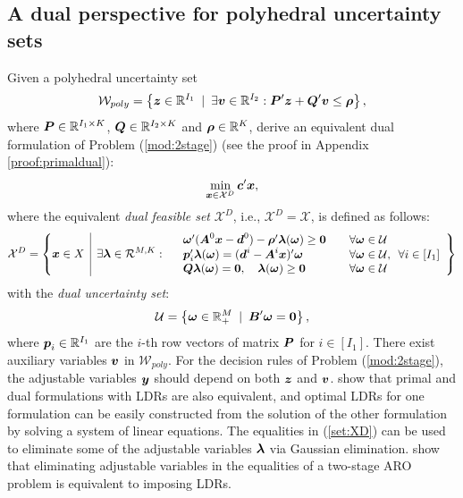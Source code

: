\documentclass[fleqn,mnsc,blindrev]{informs4}
\newcommand{\mb}[1]{\mbox{\boldmath \ensuremath{#1}}}
\begin{document}
	\subsection{A dual perspective for polyhedral uncertainty sets}
	\noindent Given a polyhedral uncertainty set
\begin{equation*}
	\mathcal{W}_{poly} = \left\{\mb{z}\in \mathbb{R}^{I_1} \enskip |\enskip \exists \mb{v} \in \mathbb{R}^{I_2}: \mb{P}'\mb{z} + \mb{Q}'\mb{v} \le \mb{\rho} \right\},
\end{equation*}
	where $\mb{P}\in \mathbb{R}^{ I_1 \times K }$, $\mb{Q}\in \mathbb{R}^{ I_2 \times K }$  and  $\mb{\rho}\in \mathbb{R}^{K}$, \cite{bd16} derive an equivalent dual formulation of Problem (\ref{mod:2stage}) (see the proof in Appendix \ref{proof:primaldual}):
\begin{equation}
		\label{mod:2stagedual}
		\min_{\boldsymbol{x} \in \mathcal{X}^D} \mb{c}'\mb{x}, 
\end{equation}
	where the equivalent {\em dual feasible set} $\mathcal{X}^D$, i.e., $\mathcal{X}^D=\mathcal{X}$, is defined as follows:
\begin{equation}
		\label{set:XD}
		\mathcal{X}^D=  \left\{ \mb{x} \in X \enskip \vline \enskip
		\exists \mb{\lambda} \in \mathcal{R}^{M,K}:	\begin{array}{lll}
			&  \mb{\omega}' (\mb{A}^0\mb{x}-\mb{d}^0) - \mb{\rho}'\mb{\lambda}(\mb{\omega}) \ge \mb{0} & \quad  \forall \mb{\omega} \in \mathcal{U}\\
			&\mb{p}_i'\mb{\lambda}(\mb{\omega}) = (\mb{d}^i- \mb{A}^i\mb{x})'\mb{\omega} & \quad  \forall \mb{\omega} \in \mathcal{U}, \enskip \forall i\in [I_1]\\
			&\displaystyle  \mb{Q}\mb{\lambda}(\mb{\omega}) = \mb{0}, \quad  \mb{\lambda}(\mb{\omega}) \ge \mb{0} & \quad \forall \mb{\omega} \in \mathcal{U}
		\end{array}
		\right\}
\end{equation}
	with the {\it dual uncertainty set}:
\begin{equation*}\label{set:U}
	\mathcal{U} = \left\{\mb{\omega}\in \mathbb{R}^{M}_+ \enskip |\enskip \mb{B}'\mb{\omega} = \mb{0} \right\},
\end{equation*}
	where $\mb{p}_i\in \mathbb{R}^{I_1}$ are the $i$-th row vectors of matrix $\mb{P}$ for $i\in [I_1]$.  There exist auxiliary variables $\mb{v}$ in $\mathcal{W}_{poly}$. For the decision rules of Problem (\ref{mod:2stage}), the adjustable variables $\mb{y}$ should depend on both $\mb{z}$ and $\mb{v}$. \cite{bd16} show that primal and dual formulations with LDRs are also equivalent, and optimal LDRs for one formulation can be easily constructed from the solution of the other formulation by solving a system of linear equations. The equalities in (\ref{set:XD}) can be used to eliminate some of the adjustable variables $\mb{\lambda}$ via Gaussian elimination.  {\cite{zd17b} show that eliminating adjustable variables in the equalities of a two-stage ARO problem is equivalent to imposing LDRs.}
	
\end{document}
